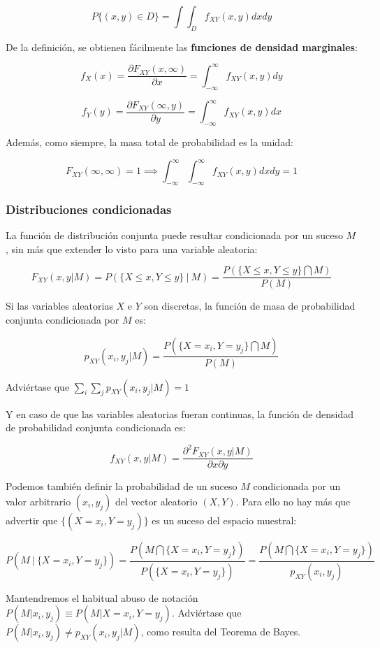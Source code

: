 \documentclass[11pt]{article}
\begin{document}
\[
P\{(x, y) \in D\}=\int \int_{D} f_{XY}(x, y) dx dy
\]

De la definición, se obtienen fácilmente las \textbf{funciones de
densidad marginales}:

\[
f_{X}(x)=\frac{\partial F_{XY}(x, \infty)}{\partial x} = \int_{-\infty}^{\infty} f_{XY}(x, y) dy
\]

\[
f_{Y}(y)=\frac{\partial F_{XY}(\infty , y)}{\partial y} = \int_{-\infty}^{\infty} f_{XY}(x, y) dx
\]

Además, como siempre, la masa total de probabilidad es la unidad:

\[
 F_{XY}(\infty , \infty) = 1 \implies \int_{-\infty}^{\infty} \int_{-\infty}^{\infty} f_{XY}(x, y) d x d y=1
\]

    \hypertarget{distribuciones-condicionadas}{%
\subsubsection{Distribuciones
condicionadas}\label{distribuciones-condicionadas}}

La función de distribución conjunta puede resultar condicionada por un
suceso \(M\), sin más que extender lo visto para una variable aleatoria:

\[
F_{XY}(x, y | M)=P(\{X \leq x, Y \leq y\} \ | \ M)= \frac{P(\{X \leq x, Y \leq y\} \bigcap M)}{P(M)}
\]

Si las variables aleatorias \(X\) e \(Y\) son discretas, la función de
masa de probabilidad conjunta condicionada por \(M\) es:

\[p_{XY}(x_i,y_j | M) = \frac{P(\{X=x_i,Y=y_j\}\bigcap M)}{P(M)} \]

Adviértase que \(\sum_i\sum_j p_{XY}(x_i,y_j | M) =1\)

Y en caso de que las variables aleatorias fueran continuas, la función
de densidad de probabilidad conjunta condicionada es:

\[
f_{XY}(x, y | M)=\frac{\partial^{2} F_{XY}(x, y | M)}{\partial x \partial y }
\]

    Podemos también definir la probabilidad de un suceso \(M\) condicionada
por un valor arbitrario \((x_i,y_j)\) del vector aleatorio \((X,Y)\).
Para ello no hay más que advertir que \(\{(X=x_i, Y=y_j)\}\) es un
suceso del espacio muestral:

\[P(M \ | \ \{X=x_i,Y=y_j\})= \frac{P(M \bigcap \{X=x_i, Y=y_j\})}{P(\{X=x_i, Y=y_j\})}=\frac{P(M \bigcap \{X=x_i,Y=y_j\})}{p_{XY}(x_i,y_j)}\]

Mantendremos el habitual abuso de notación
\(P(M | x_i,y_j)\equiv P(M | X=x_i,Y=y_j)\). Adviértase que
\(P(M | x_i,y_j) \neq p_{XY}(x_i,y_j | M)\), como resulta del Teorema de
Bayes.
\end{document}
